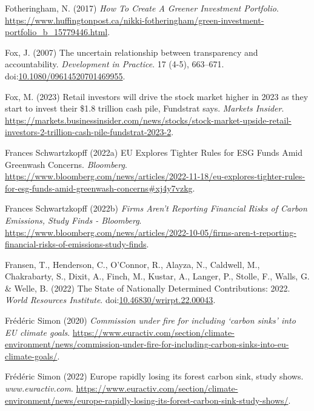 \documentclass[
  letterpaper,
  DIV=11,
  numbers=noendperiod]{scrartcl}
\newlength{\cslhangindent}
\newenvironment{CSLReferences}[2] %
 {\begin{list}{}{%
  \setlength{\itemindent}{0pt}
  \setlength{\leftmargin}{0pt}
  \setlength{\parsep}{0pt}
  \ifodd #1
   \setlength{\leftmargin}{\cslhangindent}
   \setlength{\itemindent}{-1\cslhangindent}
  \fi
  \setlength{\itemsep}{#2\baselineskip}}}
 {\end{list}}
\begin{document}
\begin{CSLReferences}{0}{1}
Fotheringham, N. (2017) \emph{How {To Create A Greener Investment
Portfolio}}.
\url{https://www.huffingtonpost.ca/nikki-fotheringham/green-investment-portfolio_b_15779446.html}.

Fox, J. (2007) The uncertain relationship between transparency and
accountability. \emph{Development in Practice}. 17 (4-5), 663--671.
doi:\href{https://doi.org/10.1080/09614520701469955}{10.1080/09614520701469955}.

Fox, M. (2023) Retail investors will drive the stock market higher in
2023 as they start to invest their \$1.8 trillion cash pile, {Fundstrat}
says. \emph{Markets Insider}.
\url{https://markets.businessinsider.com/news/stocks/stock-market-upside-retail-investors-2-trillion-cash-pile-fundstrat-2023-2}.

Frances Schwartzkopff (2022a) {EU Explores Tighter Rules} for {ESG Funds
Amid Greenwash Concerns}. \emph{Bloomberg}.
\url{https://www.bloomberg.com/news/articles/2022-11-18/eu-explores-tighter-rules-for-esg-funds-amid-greenwash-concerns\#xj4y7vzkg}.

Frances Schwartzkopff (2022b) \emph{Firms {Aren}'t {Reporting Financial
Risks} of {Carbon Emissions}, {Study Finds} - {Bloomberg}}.
\url{https://www.bloomberg.com/news/articles/2022-10-05/firms-aren-t-reporting-financial-risks-of-emissions-study-finds}.

Fransen, T., Henderson, C., O'Connor, R., Alayza, N., Caldwell, M.,
Chakrabarty, S., Dixit, A., Finch, M., Kustar, A., Langer, P., Stolle,
F., Walls, G. \& Welle, B. (2022) The {State} of {Nationally Determined
Contributions}: 2022. \emph{World Resources Institute}.
doi:\href{https://doi.org/10.46830/wrirpt.22.00043}{10.46830/wrirpt.22.00043}.

Frédéric Simon (2020) \emph{Commission under fire for including {`carbon
sinks'} into {EU} climate goals}.
\url{https://www.euractiv.com/section/climate-environment/news/commission-under-fire-for-including-carbon-sinks-into-eu-climate-goals/}.

Frédéric Simon (2022) Europe rapidly losing its forest carbon sink,
study shows. \emph{www.euractiv.com}.
\url{https://www.euractiv.com/section/climate-environment/news/europe-rapidly-losing-its-forest-carbon-sink-study-shows/}.


\end{CSLReferences}
\end{document}
